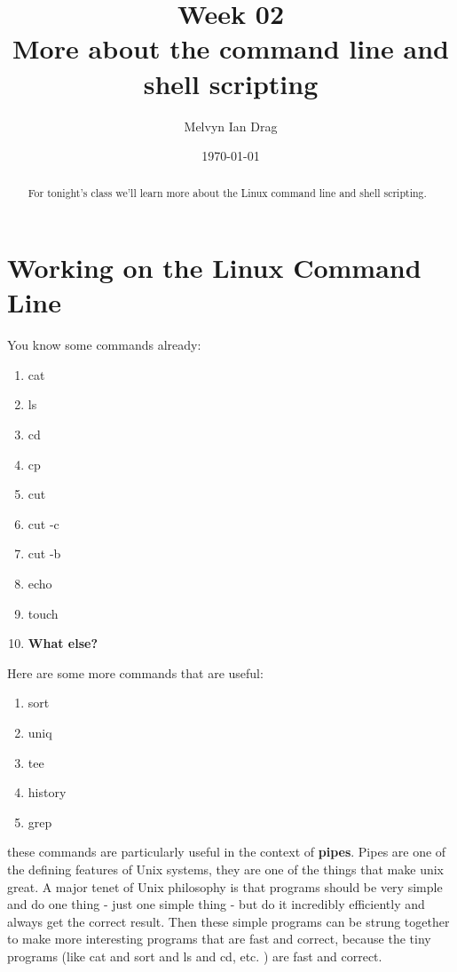 \documentclass[10pt]{article}
\title{\textbf{Week 02} \\
More about the command line and shell scripting}
\author{
	Melvyn Ian Drag
}
\date{\today}
\begin{document}
\maketitle

\begin{abstract}
For tonight's class we'll learn more about the Linux command line and shell
scripting.
\end{abstract}

\section*{Working on the Linux Command Line}
You know some commands already:
\begin{multicols}{4}
\begin{enumerate}
\item cat
\item ls
\item cd
\item cp
\item cut
\item cut -c
\item cut -b
\item echo
\item touch
\item \textbf{What else?}
\end{enumerate}
\end{multicols}

Here are some more commands that are useful:
\begin{multicols}{4}
\begin{enumerate}
\item sort
\item uniq
\item tee
\item history
\item grep 
\end{enumerate}
\end{multicols}

these commands are particularly useful in the context of \textbf{pipes}. Pipes
are one of the defining features of Unix systems, they are one of the things
that make unix great. A major tenet of Unix philosophy is that programs should
be very simple and do one thing - just one simple thing - but do it incredibly
efficiently and always get the correct result. Then these simple
programs can be strung together to make more interesting programs that are fast
and correct, because the tiny programs  (like cat and sort and ls and cd, etc. )
are fast and correct.
\end{document}
